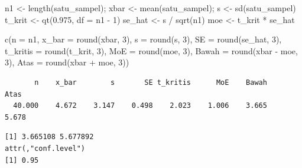 \documentclass[
  indonesian,
  letterpaper,
]{book}
\newenvironment{Shaded}{\begin{snugshade}}{\end{snugshade}}
\newcommand{\AttributeTok}[1]{\textcolor[rgb]{0.40,0.45,0.13}{#1}}
\newcommand{\CommentTok}[1]{\textcolor[rgb]{0.37,0.37,0.37}{#1}}
\newcommand{\DecValTok}[1]{\textcolor[rgb]{0.68,0.00,0.00}{#1}}
\newcommand{\FloatTok}[1]{\textcolor[rgb]{0.68,0.00,0.00}{#1}}
\newcommand{\FunctionTok}[1]{\textcolor[rgb]{0.28,0.35,0.67}{#1}}
\newcommand{\NormalTok}[1]{\textcolor[rgb]{0.00,0.23,0.31}{#1}}
\newcommand{\OtherTok}[1]{\textcolor[rgb]{0.00,0.23,0.31}{#1}}
\newcommand{\SpecialCharTok}[1]{\textcolor[rgb]{0.37,0.37,0.37}{#1}}
\begin{document}
\begin{Shaded}
\begin{Highlighting}[]
\NormalTok{n1 }\OtherTok{\textless{}{-}} \FunctionTok{length}\NormalTok{(satu\_sampel); xbar }\OtherTok{\textless{}{-}} \FunctionTok{mean}\NormalTok{(satu\_sampel); s }\OtherTok{\textless{}{-}} \FunctionTok{sd}\NormalTok{(satu\_sampel)}
\NormalTok{t\_krit }\OtherTok{\textless{}{-}} \FunctionTok{qt}\NormalTok{(}\FloatTok{0.975}\NormalTok{, }\AttributeTok{df =}\NormalTok{ n1 }\SpecialCharTok{{-}} \DecValTok{1}\NormalTok{)}
\NormalTok{se\_hat }\OtherTok{\textless{}{-}}\NormalTok{ s }\SpecialCharTok{/} \FunctionTok{sqrt}\NormalTok{(n1)}
\NormalTok{moe }\OtherTok{\textless{}{-}}\NormalTok{ t\_krit }\SpecialCharTok{*}\NormalTok{ se\_hat}

\FunctionTok{c}\NormalTok{(}\AttributeTok{n =}\NormalTok{ n1, }\AttributeTok{x\_bar =} \FunctionTok{round}\NormalTok{(xbar, }\DecValTok{3}\NormalTok{), }\AttributeTok{s =} \FunctionTok{round}\NormalTok{(s, }\DecValTok{3}\NormalTok{), }\AttributeTok{SE =} \FunctionTok{round}\NormalTok{(se\_hat, }\DecValTok{3}\NormalTok{),}
  \AttributeTok{t\_kritis =} \FunctionTok{round}\NormalTok{(t\_krit, }\DecValTok{3}\NormalTok{), }\AttributeTok{MoE =} \FunctionTok{round}\NormalTok{(moe, }\DecValTok{3}\NormalTok{),}
  \AttributeTok{Bawah =} \FunctionTok{round}\NormalTok{(xbar }\SpecialCharTok{{-}}\NormalTok{ moe, }\DecValTok{3}\NormalTok{), }\AttributeTok{Atas =} \FunctionTok{round}\NormalTok{(xbar }\SpecialCharTok{+}\NormalTok{ moe, }\DecValTok{3}\NormalTok{))}
\end{Highlighting}
\end{Shaded}

\begin{verbatim}
       n    x_bar        s       SE t_kritis      MoE    Bawah     Atas 
  40.000    4.672    3.147    0.498    2.023    1.006    3.665    5.678 
\end{verbatim}

\begin{Shaded}
\end{Shaded}

\begin{verbatim}
[1] 3.665108 5.677892
attr(,"conf.level")
[1] 0.95
\end{verbatim}
\end{document}
